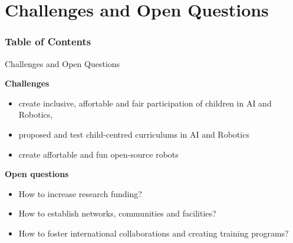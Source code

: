 \section{Challenges and Open Questions}


\begin{frame}
      \frametitle{Table of Contents}
      \tableofcontents[currentsection]
\end{frame}



{
\begin{frame}{Challenges and Open Questions}

\textbf{Challenges}   

\begin{itemize}
\item create inclusive, affortable and fair participation of children in AI and Robotics,
\item proposed and test child-centred curriculums in AI and Robotics 
\item create affortable and fun open-source robots 
\end{itemize}

\textbf{Open questions}
\begin{itemize}
\item How to increase research funding?
\item How to establish networks, communities and facilities?
\item How to foster international collaborations and creating training programs?
\end{itemize}




\end{frame}
}


